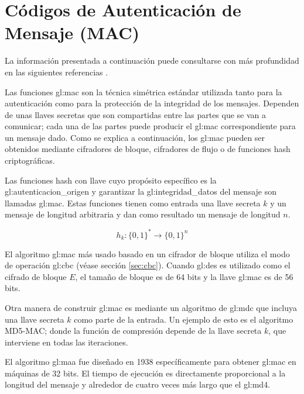 %
%

\section{Códigos de Autenticación de Mensaje (MAC)}

La información presentada a continuación puede consultarse con más profundidad
en las siguientes referencias
\cite{DBLP:series/isc/DelfsK07, menezes, mac_patel}.

Las funciones \gls{gl:mac} son la técnica simétrica
estándar utilizada tanto para la autenticación como para la protección de la
integridad de los mensajes. Dependen de unas llaves secretas que son
compartidas entre las partes que se van a comunicar; cada una de las
partes puede producir el \gls{gl:mac} correspondiente para un mensaje
dado. Como se explica a continuación, los \gls{gl:mac} pueden ser
obtenidos mediante cifradores de bloque, cifradores de flujo o de funciones
hash criptográficas.

Las funciones hash con llave cuyo propósito específico es la
\gls{gl:autenticacion_origen} y garantizar la \gls{gl:integridad_datos} del
mensaje son llamadas \gls{gl:mac}. Estas funciones tienen como entrada
una llave secreta $k$ y un mensaje de longitud arbitraria y dan como resultado
un mensaje de longitud $n$.

\begin{equation}
  \label{funcion_hash_mac}
  h_k: \{0, 1\}^* \longrightarrow \{0,1\}^n
\end{equation}

El algoritmo \gls{gl:mac} más usado basado en un cifrador de bloque
utiliza el modo de operación \gls{gl:cbc} (véase sección \ref{sec:cbc}).
Cuando \gls{gl:des} es utilizado como el cifrado de bloque $E$, el tamaño
de bloque es de 64 bits y la llave \gls{gl:mac} es de 56 bits.

Otra manera de construir \gls{gl:mac} es mediante un algoritmo
de \gls{gl:mdc} que incluya una llave secreta $k$ como parte de la
entrada. Un ejemplo de esto es el algoritmo MD5-MAC; donde la función de
compresión depende de la llave secreta $k$, que interviene en todas las
iteraciones.

El algoritmo \gls{gl:maa} fue diseñado en 1938 específicamente para
obtener \gls{gl:mac} en máquinas de 32 bits. El tiempo de ejecución
es directamente proporcional a la longitud del mensaje y alrededor de cuatro
veces más largo que el \gls{gl:md4}.

